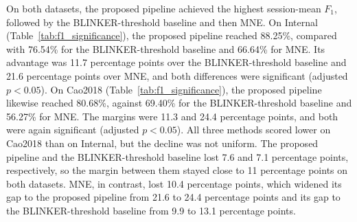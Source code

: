 On both datasets, the proposed pipeline achieved the highest session-mean $F_1$, followed by the BLINKER-threshold baseline and then MNE. On Internal (Table~\ref{tab:f1_significance}), the proposed pipeline reached 88.25\%, compared with 76.54\% for the BLINKER-threshold baseline and 66.64\% for MNE. Its advantage was 11.7 percentage points over the BLINKER-threshold baseline and 21.6 percentage points over MNE, and both differences were significant (adjusted $p < 0.05$). On Cao2018 (Table~\ref{tab:f1_significance}), the proposed pipeline likewise reached 80.68\%, against 69.40\% for the BLINKER-threshold baseline and 56.27\% for MNE. The margins were 11.3 and 24.4 percentage points, and both were again significant (adjusted $p < 0.05$). All three methods scored lower on Cao2018 than on Internal, but the decline was not uniform. The proposed pipeline and the BLINKER-threshold baseline lost 7.6 and 7.1 percentage points, respectively, so the margin between them stayed close to 11 percentage points on both datasets. MNE, in contrast, lost 10.4 percentage points, which widened its gap to the proposed pipeline from 21.6 to 24.4 percentage points and its gap to the BLINKER-threshold baseline from 9.9 to 13.1 percentage points.
